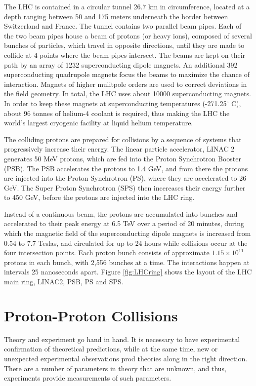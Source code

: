\documentclass[12pt,a4paper,openright,twoside]{report}
\begin{document}
The LHC is contained in a circular tunnel 26.7 km in circumference, located at a depth ranging between 50 and 175 meters underneath the border between Switzerland and France. The tunnel contains two parallel beam pipes. Each of the two beam pipes house a beam of protons (or heavy ions), composed of several bunches of particles, which travel in opposite directions, until they are made to collide at 4 points where the beam pipes intersect. The beams are kept on their path by an array of 1232 superconducting dipole magnets. An additional 392 superconducting quadrupole magnets focus the beams to maximize the chance of interaction. Magnets of higher mulitpole orders are used to correct deviations in the field geometry. In total, the LHC uses about 10000 superconducting magnets. In order to keep these magnets at superconducting temperatures (-271.25$^\circ$ C), about 96 tonnes of helium-4 coolant is required, thus making the LHC the world's largest cryogenic facility at liquid helium temperature.

The colliding protons are prepared for collisions by a sequence of systems that progressively increase their energy. The linear particle accelerator, LINAC 2 generates 50 MeV protons, which are fed into the Proton Synchrotron Booster (PSB). The PSB accelerates the protons to 1.4 GeV, and from there the protons are injected into the Proton Synchrotron (PS), where they are accelerated to 26 GeV. The Super Proton Synchrotron (SPS) then incereases their energy further to 450 GeV, before the protons are injected into the LHC ring. 

Instead of a continuous beam, the protons are accumulated into bunches and accelerated to their peak energy at 6.5 TeV over a period of 20 minutes, during which the magnetic field of the superconducting dipole magnets is increased from 0.54 to 7.7 Teslas, and circulated for up to 24 hours while collisions occur at the four intersection points. Each proton bunch consists of approximate $1.15\times 10^{11}$ protons in each bunch, with 2,556 bunches \cite{bunch} at a time. The interactions happen at intervals 25 nanoseconds apart. Figure \ref{fig:LHCring} shows the layout of the LHC main ring, LINAC2, PSB, PS and SPS.

\section{Proton-Proton Collisions}
Theory and experiment go hand in hand. It is necessary to have experimental confirmation of theoretical predictions, while at the same time, new or unexpected experimental observations prod theories along in the right direction. There are a number of parameters in theory that are unknown, and thus, experiments provide measurements of such parameters. 
\end{document}
